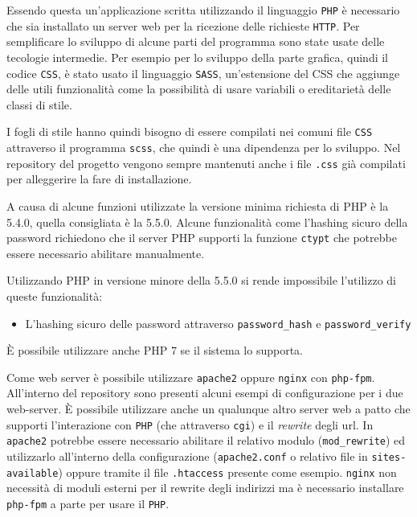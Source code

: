 Essendo questa un'applicazione scritta utilizzando il linguaggio \texttt{PHP} è necessario che sia installato un server web per la ricezione delle richieste \texttt{HTTP}. Per semplificare lo sviluppo di alcune parti del programma sono state usate delle tecologie intermedie. Per esempio per lo sviluppo della parte grafica, quindi il codice \texttt{CSS}, è stato usato il linguaggio \texttt{SASS}, un'estensione del CSS che aggiunge delle utili funzionalità come la possibilità di usare variabili o ereditarietà delle classi di stile.

I fogli di stile hanno quindi bisogno di essere compilati nei comuni file \texttt{CSS} attraverso il programma \texttt{scss}, che quindi è una dipendenza per lo sviluppo. Nel repository del progetto vengono sempre mantenuti anche i file \texttt{.css} già compilati per alleggerire la fare di installazione.

A causa di alcune funzioni utilizzate la versione minima richiesta di PHP è la 5.4.0, quella consigliata è la 5.5.0. Alcune funzionalità come l'hashing sicuro della password richiedono che il server PHP supporti la funzione \texttt{ctypt} che potrebbe essere necessario abilitare manualmente.

Utilizzando PHP in versione minore della 5.5.0 si rende impossibile l'utilizzo di queste funzionalità:

\begin{itemize}
	\item L'hashing sicuro delle password attraverso \texttt{password\_hash} e \texttt{password\_verify}
\end{itemize}

È possibile utilizzare anche PHP 7 se il sistema lo supporta.

Come web server è possibile utilizzare \texttt{apache2} oppure \texttt{nginx} con \texttt{php-fpm}. All'interno del repository sono presenti alcuni esempi di configurazione per i due web-server. È possibile utilizzare anche un qualunque altro server web a patto che supporti l'interazione con \texttt{PHP} (che attraverso \texttt{cgi}) e il \emph{rewrite} degli url. In \texttt{apache2} potrebbe essere necessario abilitare il relativo modulo (\texttt{mod\_rewrite}) ed utilizzarlo all'interno della configurazione (\texttt{apache2.conf} o relativo file in \texttt{sites-available}) oppure tramite il file \texttt{.htaccess} presente come esempio. \texttt{nginx} non necessità di moduli esterni per il rewrite degli indirizzi ma è necessario installare \texttt{php-fpm} a parte per usare il \texttt{PHP}.

